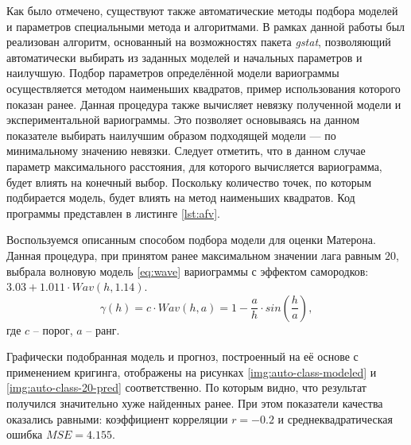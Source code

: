 Как было отмечено, существуют также автоматические методы подбора моделей и параметров специальными метода и алгоритмами. В рамках данной работы был реализован алгоритм, основанный на возможностях пакета \textit{gstat}, позволяющий автоматически выбирать из заданных моделей и начальных параметров и наилучшую. Подбор параметров определённой модели вариограммы осуществляется методом наименьших квадратов, пример использования которого показан ранее. Данная процедура также вычисляет невязку полученной модели и экспериментальной вариограммы. Это позволяет основываясь на данном показателе выбирать наилучшим образом подходящей модели --- по минимальному значению невязки. Следует отметить, что в данном случае параметр максимального расстояния, для которого вычисляется вариограмма, будет влиять на конечный выбор. Поскольку количество точек, по которым подбирается модель, будет влиять на метод наименьших квадратов. Код программы представлен в листинге \ref{lst:afv}.

Воспользуемся описанным способом подбора модели для оценки Матерона. Данная процедура, при принятом ранее максимальном значении лага равным $ 20 $, выбрала волновую модель \eqref{eq:wave} вариограммы с эффектом самородков: $ 3.03 + 1.011 \cdot Wav(h, 1.14) $.
\begin{equation}
\label{eq:wave}
	\gamma(h) = c \cdot Wav(h, a) = 1 - \frac{a}{h} \cdot sin(\frac{h}{a}),
\end{equation}
где $ c $ -- порог, $ a $ -- ранг.

Графически подобранная модель и прогноз, построенный на её основе с применением кригинга, отображены на рисунках \ref{img:auto-class-modeled} и \ref{img:auto-class-20-pred} соответственно. По которым видно, что результат получился значительно хуже найденных ранее. При этом показатели качества оказались равными: коэффициент корреляции $ r = -0.2 $ и среднеквадратическая ошибка $ MSE = 4.155 $.

